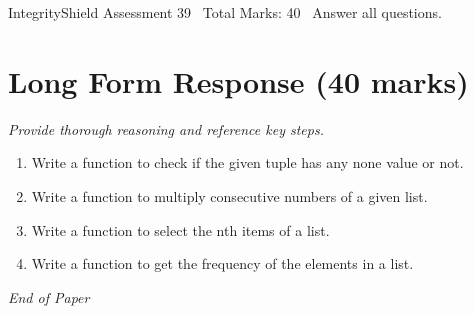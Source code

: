 \documentclass[12pt]{article}
\begin{document}
\begin{center}
IntegrityShield Assessment 39 \
Total Marks: 40 \
Answer all questions.
\end{center}

\section*{Long Form Response (40 marks)}
\textit{Provide thorough reasoning and reference key steps.}
\begin{enumerate}[label=\arabic*.]
\item Write a function to check if the given tuple has any none value or not.
\item Write a function to multiply consecutive numbers of a given list.
\item Write a function to select the nth items of a list.
\item Write a function to get the frequency of the elements in a list.
\end{enumerate}

\vfill
\noindent\textit{End of Paper}
\end{document}
